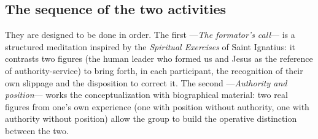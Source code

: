 \documentclass[11pt, a4paper]{article}
\begin{document}
\subsection*{The sequence of the two activities}

They are designed to be done in order. The first ---\emph{The formator's call}--- is a structured meditation inspired by the \emph{Spiritual Exercises} of Saint Ignatius: it contrasts two figures (the human leader who formed us and Jesus as the reference of authority-service) to bring forth, in each participant, the recognition of their own slippage and the disposition to correct it. The second ---\emph{Authority and position}--- works the conceptualization with biographical material: two real figures from one's own experience (one with position without authority, one with authority without position) allow the group to build the operative distinction between the two.

\vspace{1.5em}
\end{document}
